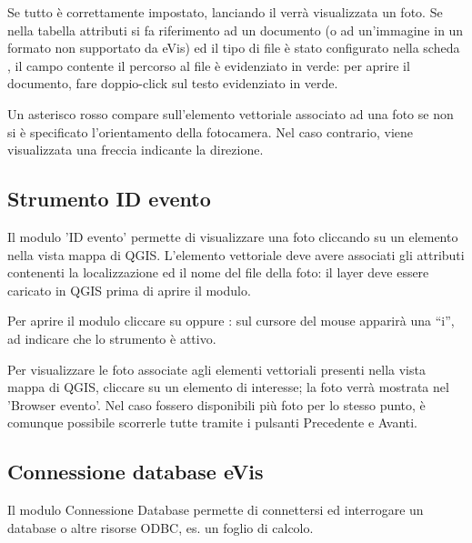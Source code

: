 \label{evis_using_browser}
 
Se tutto è correttamente impostato, lanciando il  verrà visualizzata un foto.
Se nella tabella attributi si fa riferimento ad un documento (o ad un'immagine in un formato non
supportato da eVis) ed il tipo di file è stato configurato nella scheda , 
il campo contente il percorso al file è evidenziato in verde: per aprire il documento, fare doppio-click 
sul testo evidenziato in verde.

Un asterisco rosso compare sull'elemento vettoriale associato ad una foto se non si è specificato 
l'orientamento della fotocamera. Nel caso contrario, viene visualizzata una freccia indicante la direzione. 

\subsection{Strumento ID evento}\label{evis_id_tool}

Il modulo 'ID evento' permette di visualizzare una foto cliccando su un elemento nella vista mappa di QGIS.
L'elemento vettoriale deve avere associati gli attributi contenenti la localizzazione ed il nome del file
della foto: il layer deve essere caricato in QGIS prima di aprire il modulo.

\label{evis_launch_id}

Per aprire il modulo cliccare su  oppure  \arrow 
{} \arrow {}: sul cursore del mouse apparirà una ``i'', ad indicare che
lo strumento è attivo.

Per visualizzare le foto associate agli elementi vettoriali presenti nella vista mappa di QGIS, cliccare su
un elemento di interesse; la foto verrà mostrata nel 'Browser evento'. Nel caso fossero disponibili più foto
per lo stesso punto, è comunque possibile scorrerle tutte tramite i pulsanti Precedente e Avanti. 

\subsection{Connessione database eVis}\label{evis_database}

Il modulo Connessione Database permette di connettersi ed interrogare un database o altre risorse ODBC, es. un foglio di calcolo.

